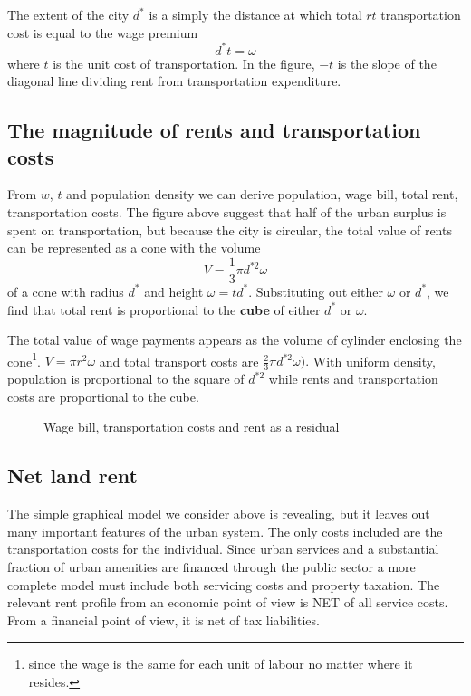 The extent  of the city  $d^*$ is a simply the distance at which total $rt$ transportation cost  is equal to the wage premium
\[d^* t= \omega\]
where $t$ is the unit cost of transportation. In the figure, $-t$ is the slope of the diagonal line dividing rent from transportation expenditure.


 \subsection{The magnitude of rents and transportation costs}
 From $w$, $t$ and population density we can derive population, wage bill, total rent, transportation costs. The figure above suggest that  half of the urban surplus is spent on transportation, but because the city is circular, the total value of rents can be represented as  a cone with the volume  \[ V=\frac{1}{3}\pi  d^{*2} \omega \]
of a cone with radius $d^*$ and  height $\omega = td^*$. Substituting out either  $\omega$ or  $d^*$, we find that total rent is  proportional to the \textbf{cube} of either  $d^*$ or $\omega$. 

The total value of wage payments appears as the volume of cylinder enclosing the cone\footnote{since the wage is the same for each unit of labour no matter where it resides.}.  
$V=\pi r^2 \omega$ 
and total transport costs are 
$\frac{2}{3}\pi  d^{*2} \omega).$
With uniform density, population is proportional to the square of  $d^{*2}$ while rents and  transportation costs are proportional to the cube. %

\begin{figure}
    \begin{center}
    
    \caption{Wage bill, transportation costs and rent as a residual  }
    \label{fig:city_conical}
    \end{center}
\end{figure}


\subsection{Net land rent} 
The simple graphical model we consider above is revealing, but it leaves out many important features of the urban system. The only costs included are the transportation costs for the individual.  Since urban services and  a substantial fraction of urban amenities are financed through the public sector a more complete model must include both servicing costs and property taxation. The relevant rent profile from an economic point of view is NET of all service costs. From a financial point of view, it is net of tax liabilities.%

